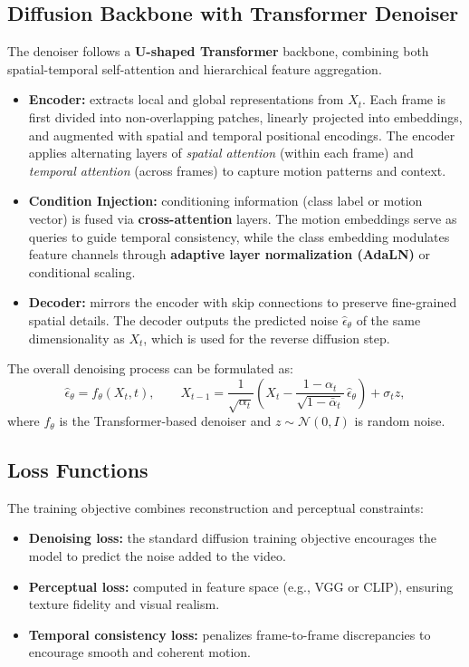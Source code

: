 \documentclass[11pt,a4paper]{article}
\begin{document}
\subsection{Diffusion Backbone with Transformer Denoiser}
The denoiser follows a \textbf{U-shaped Transformer} backbone, combining both spatial-temporal self-attention and hierarchical feature aggregation.

\begin{itemize}
    \item \textbf{Encoder:} extracts local and global representations from $X_t$. 
    Each frame is first divided into non-overlapping patches, linearly projected into embeddings, and augmented with spatial and temporal positional encodings. 
    The encoder applies alternating layers of \textit{spatial attention} (within each frame) and \textit{temporal attention} (across frames) to capture motion patterns and context.
    
    \item \textbf{Condition Injection:} conditioning information (class label or motion vector) is fused via \textbf{cross-attention} layers. 
    The motion embeddings serve as queries to guide temporal consistency, while the class embedding modulates feature channels through \textbf{adaptive layer normalization (AdaLN)} or conditional scaling.

    \item \textbf{Decoder:} mirrors the encoder with skip connections to preserve fine-grained spatial details. 
    The decoder outputs the predicted noise $\hat{\epsilon}_\theta$ of the same dimensionality as $X_t$, which is used for the reverse diffusion step.
\end{itemize}

\noindent
The overall denoising process can be formulated as:
\[
\hat{\epsilon}_\theta = f_\theta(X_t, t), \qquad 
X_{t-1} = \frac{1}{\sqrt{\alpha_t}} \left( X_t - \frac{1-\alpha_t}{\sqrt{1-\bar{\alpha}_t}}\, \hat{\epsilon}_\theta \right) + \sigma_t z,
\]
where $f_\theta$ is the Transformer-based denoiser and $z \sim \mathcal{N}(0,I)$ is random noise.

\subsection{Loss Functions}
The training objective combines reconstruction and perceptual constraints:
\begin{itemize}
    \item \textbf{Denoising loss:} the standard diffusion training objective encourages the model to predict the noise added to the video.
    \item \textbf{Perceptual loss:} computed in feature space (e.g., VGG or CLIP), ensuring texture fidelity and visual realism.
    \item \textbf{Temporal consistency loss:} penalizes frame-to-frame discrepancies to encourage smooth and coherent motion.
\end{itemize}
\end{document}
